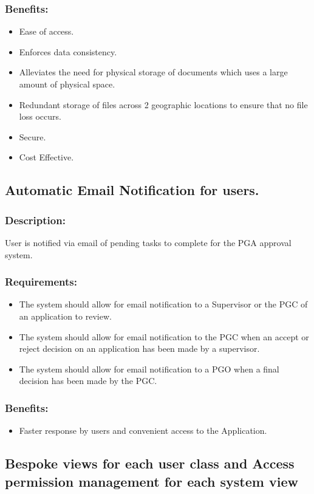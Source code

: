 \documentclass[]{article}
\begin{document}
\subsubsection{Benefits:}
\begin{itemize}
	\item Ease of access.
	\item Enforces data consistency.
	\item Alleviates the need for physical storage of documents which uses a large amount of physical space.
	\item Redundant storage of files across 2 geographic locations to ensure that no file loss occurs.
	\item Secure.
	\item Cost Effective.
\end{itemize}

\subsection{Automatic Email Notification for users. }
\subsubsection{ Description: }User is notified via email of pending tasks to complete for the PGA approval system.                          
\subsubsection{ Requirements:} 
\begin{itemize}
\item The system should allow for email notification to a Supervisor or the PGC of an application to review.
\item The system should allow for email notification to the PGC when an accept or reject decision on an application has been made by a supervisor.
\item The system should allow for email notification to a PGO when a final decision has been made by the PGC.
\end{itemize}
\subsubsection{Benefits:}
\begin{itemize}
	\item Faster response by users and convenient access to the Application. 
\end{itemize}
\subsection{Bespoke views for each user class and Access permission management for each system view}
\end{document}
